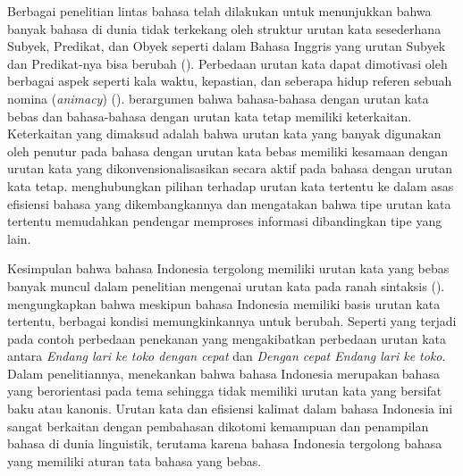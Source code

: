 Berbagai penelitian lintas bahasa telah dilakukan untuk menunjukkan bahwa banyak bahasa di dunia tidak terkekang oleh struktur urutan kata sesederhana Subyek, Predikat, dan Obyek seperti dalam Bahasa Inggris yang urutan Subyek dan Predikat-nya bisa berubah (\citealp{macwhinneybates1989cross, birnerward1998noncanonical, lambrecht2000info}). Perbedaan urutan kata dapat dimotivasi oleh berbagai aspek seperti kala waktu, kepastian, dan seberapa hidup referen sebuah nomina (\textit{animacy}) (\citealp{dryer1992greenbergian, tsunoda1995adpositions, polinskaja1989object}). \cite{hawkins1994performance} berargumen bahwa bahasa-bahasa dengan urutan kata bebas dan bahasa-bahasa dengan urutan kata tetap memiliki keterkaitan. Keterkaitan yang dimaksud adalah bahwa urutan kata yang banyak digunakan oleh penutur pada bahasa dengan urutan kata bebas memiliki kesamaan dengan urutan kata yang dikonvensionalisasikan secara aktif pada bahasa dengan urutan kata tetap. \citet[p. 110]{hawkins1994performance} menghubungkan pilihan terhadap urutan kata tertentu ke dalam asas efisiensi bahasa yang dikembangkannya dan mengatakan bahwa tipe urutan kata tertentu memudahkan pendengar memproses informasi dibandingkan tipe yang lain.

Kesimpulan bahwa bahasa Indonesia tergolong memiliki urutan kata yang bebas banyak muncul dalam penelitian mengenai urutan kata pada ranah sintaksis (\citealp{stack2005word, postman2004processing}). \citet[pp. 209-268]{sneddon2010indonesian} mengungkapkan bahwa meskipun bahasa Indonesia memiliki basis urutan kata tertentu, berbagai kondisi memungkinkannya untuk berubah. Seperti yang terjadi pada contoh perbedaan penekanan yang mengakibatkan perbedaan urutan kata antara \textit{Endang lari ke toko dengan cepat} dan \textit{Dengan cepat Endang lari ke toko}. Dalam penelitiannya, \cite{postman2004processing} menekankan bahwa bahasa Indonesia merupakan bahasa yang berorientasi pada tema sehingga tidak memiliki urutan kata yang bersifat baku atau kanonis. Urutan kata dan efisiensi kalimat dalam bahasa Indonesia ini sangat berkaitan dengan pembahasan dikotomi kemampuan dan penampilan bahasa di dunia linguistik, terutama karena bahasa Indonesia tergolong bahasa yang memiliki aturan tata bahasa yang bebas.

